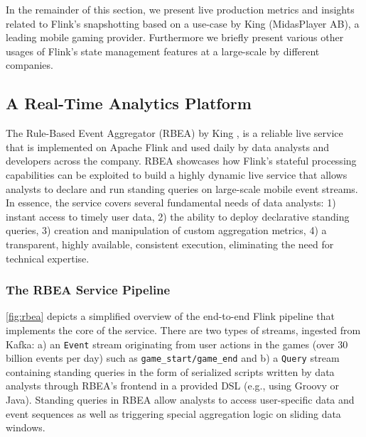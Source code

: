 In the remainder of this section, we present live production metrics and insights related to Flink's snapshotting based on a use-case by King (MidasPlayer AB), a leading mobile gaming provider. Furthermore we briefly present various other usages of Flink's state management features at a large-scale by different companies.

\subsection{A Real-Time Analytics Platform}

The Rule-Based Event Aggregator (RBEA) by King \cite{CUSTOM:web/kingrbea}, is a reliable live service that is implemented on Apache Flink and used daily by data analysts and developers across the company. RBEA showcases how Flink's stateful processing capabilities can be exploited to build a highly dynamic live service that allows analysts to declare and run standing queries on large-scale mobile event streams. In essence, the service covers several fundamental needs of data analysts: 1) instant access to timely user data, 2) the ability to deploy declarative standing queries, 3) creation and manipulation of custom aggregation metrics, 4) a transparent, highly available, consistent execution, eliminating the need for technical expertise.

\subsubsection{The RBEA Service Pipeline}
\autoref{fig:rbea} depicts a simplified overview of the end-to-end Flink pipeline that implements the core of the service. There are two types of streams, ingested from Kafka: a) an \texttt{Event} stream originating from  user actions in the games (over 30 billion events per day) such as \texttt{game\_start/game\_end} and b) a \texttt{Query} stream containing standing queries in the form of serialized scripts written by data analysts through RBEA's frontend in a provided DSL (e.g., using Groovy or Java). Standing queries in RBEA allow analysts to access user-specific data and event sequences as well as triggering special aggregation logic on sliding data windows. %

